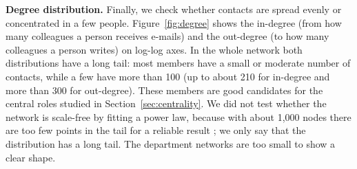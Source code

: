\documentclass[12pt, a4paper]{article}
\begin{document}
\textbf{Degree distribution.} Finally, we check whether contacts are spread
evenly or concentrated in a few people. Figure~\ref{fig:degree} shows the
in-degree (from how many colleagues a person receives e-mails) and the
out-degree (to how many colleagues a person writes) on log-log axes. In the
whole network both distributions have a long tail: most members have a small or
moderate number of contacts, while a few have more than 100 (up to about 210
for in-degree and more than 300 for out-degree). These members are good
candidates for the central roles studied in Section~\ref{sec:centrality}. We
did not test whether the network is scale-free by fitting a power law, because
with about 1{,}000 nodes there are too few points in the tail for a reliable
result \cite{newman2018}; we only say that the distribution has a long tail.
The department networks are too small to show a clear shape.
\end{document}
